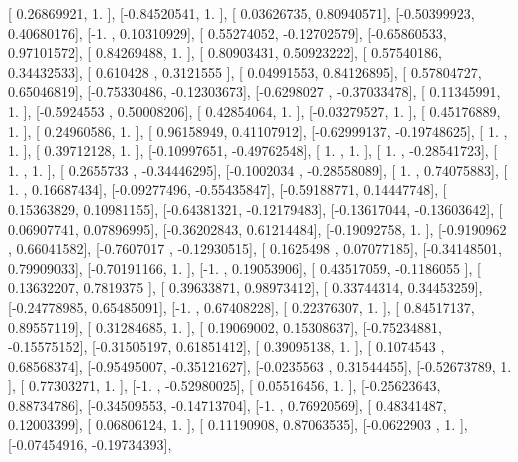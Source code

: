 \documentclass{article}
\begin{document}
       [ 0.26869921,  1.        ],
       [-0.84520541,  1.        ],
       [ 0.03626735,  0.80940571],
       [-0.50399923,  0.40680176],
       [-1.        ,  0.10310929],
       [ 0.55274052, -0.12702579],
       [-0.65860533,  0.97101572],
       [ 0.84269488,  1.        ],
       [ 0.80903431,  0.50923222],
       [ 0.57540186,  0.34432533],
       [ 0.610428  ,  0.3121555 ],
       [ 0.04991553,  0.84126895],
       [ 0.57804727,  0.65046819],
       [-0.75330486, -0.12303673],
       [-0.6298027 , -0.37033478],
       [ 0.11345991,  1.        ],
       [-0.5924553 ,  0.50008206],
       [ 0.42854064,  1.        ],
       [-0.03279527,  1.        ],
       [ 0.45176889,  1.        ],
       [ 0.24960586,  1.        ],
       [ 0.96158949,  0.41107912],
       [-0.62999137, -0.19748625],
       [ 1.        ,  1.        ],
       [ 0.39712128,  1.        ],
       [-0.10997651, -0.49762548],
       [ 1.        ,  1.        ],
       [ 1.        , -0.28541723],
       [ 1.        ,  1.        ],
       [ 0.2655733 , -0.34446295],
       [-0.1002034 , -0.28558089],
       [ 1.        ,  0.74075883],
       [ 1.        ,  0.16687434],
       [-0.09277496, -0.55435847],
       [-0.59188771,  0.14447748],
       [ 0.15363829,  0.10981155],
       [-0.64381321, -0.12179483],
       [-0.13617044, -0.13603642],
       [ 0.06907741,  0.07896995],
       [-0.36202843,  0.61214484],
       [-0.19092758,  1.        ],
       [-0.9190962 ,  0.66041582],
       [-0.7607017 , -0.12930515],
       [ 0.1625498 ,  0.07077185],
       [-0.34148501,  0.79909033],
       [-0.70191166,  1.        ],
       [-1.        ,  0.19053906],
       [ 0.43517059, -0.1186055 ],
       [ 0.13632207,  0.7819375 ],
       [ 0.39633871,  0.98973412],
       [ 0.33744314,  0.34453259],
       [-0.24778985,  0.65485091],
       [-1.        ,  0.67408228],
       [ 0.22376307,  1.        ],
       [ 0.84517137,  0.89557119],
       [ 0.31284685,  1.        ],
       [ 0.19069002,  0.15308637],
       [-0.75234881, -0.15575152],
       [-0.31505197,  0.61851412],
       [ 0.39095138,  1.        ],
       [ 0.1074543 ,  0.68568374],
       [-0.95495007, -0.35121627],
       [-0.0235563 ,  0.31544455],
       [-0.52673789,  1.        ],
       [ 0.77303271,  1.        ],
       [-1.        , -0.52980025],
       [ 0.05516456,  1.        ],
       [-0.25623643,  0.88734786],
       [-0.34509553, -0.14713704],
       [-1.        ,  0.76920569],
       [ 0.48341487,  0.12003399],
       [ 0.06806124,  1.        ],
       [ 0.11190908,  0.87063535],
       [-0.0622903 ,  1.        ],
       [-0.07454916, -0.19734393],
\end{document}
